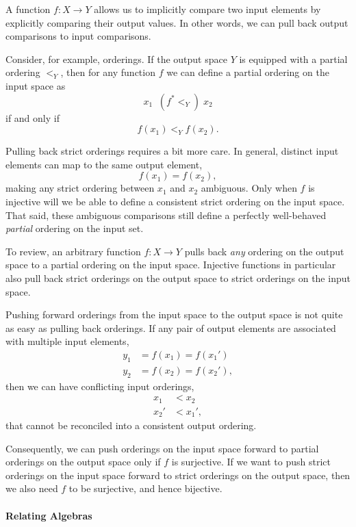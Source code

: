 \documentclass[
  letterpaper,
  DIV=11,
  numbers=noendperiod]{scrartcl}
\let\oldparagraph\paragraph
\renewcommand{\paragraph}[1]{\oldparagraph{#1}\mbox{}}
\begin{document}
A function \(f : X \rightarrow Y\) allows us to implicitly compare two
input elements by explicitly comparing their output values. In other
words, we can pull back output comparisons to input comparisons.

Consider, for example, orderings. If the output space \(Y\) is equipped
with a partial ordering \(<_{Y}\), then for any function \(f\) we can
define a partial ordering on the input space as \[
x_{1} \;\; (f^{*}\!\!<_{Y}) \; x_{2}
\] if and only if \[
f(x_{1}) <_{Y} f(x_{2}).
\]

Pulling back strict orderings requires a bit more care. In general,
distinct input elements can map to the same output element, \[
f(x_{1}) = f(x_{2}),
\] making any strict ordering between \(x_{1}\) and \(x_{2}\) ambiguous.
Only when \(f\) is injective will we be able to define a consistent
strict ordering on the input space. That said, these ambiguous
comparisons still define a perfectly well-behaved \emph{partial}
ordering on the input set.

To review, an arbitrary function \(f : X \rightarrow Y\) pulls back
\emph{any} ordering on the output space to a partial ordering on the
input space. Injective functions in particular also pull back strict
orderings on the output space to strict orderings on the input space.

Pushing forward orderings from the input space to the output space is
not quite as easy as pulling back orderings. If any pair of output
elements are associated with multiple input elements, \begin{align*}
y_{1} &= f(x_1) = f(x_1')
\\
y_{2} &= f(x_2) = f(x_2'),
\end{align*} then we can have conflicting input orderings,
\begin{align*}
x_1 &< x_2
\\
x_2' &< x_1',
\end{align*} that cannot be reconciled into a consistent output
ordering.

Consequently, we can push orderings on the input space forward to
partial orderings on the output space only if \(f\) is surjective. If we
want to push strict orderings on the input space forward to strict
orderings on the output space, then we also need \(f\) to be surjective,
and hence bijective.

\paragraph{Relating Algebras}\label{relating-algebras}
\end{document}
